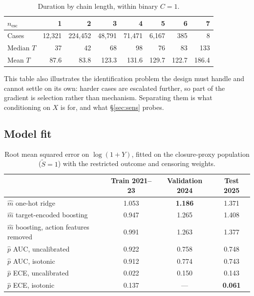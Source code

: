 \documentclass[11pt,a4paper]{article}
\theoremstyle{plain}
\theoremstyle{definition}
\theoremstyle{remark}
\newcommand{\Sproxy}{\widetilde S}
\begin{document}
\begin{table}[h]
\centering
\caption{Duration by chain length, within binary $C=1$.}
\label{tab:nesc-evidence}
\begin{tabular}{lrrrrrrr}
\toprule
$n_{\text{esc}}$ & 1 & 2 & 3 & 4 & 5 & 6 & 7\\
\midrule
Cases & 12,321 & 224,452 & 48,791 & 71,471 & 6,167 & 385 & 8\\
Median $T$ & 37 & 42 & 68 & 98 & 76 & 83 & 133\\
Mean $T$ & 87.6 & 83.8 & 123.3 & 131.6 & 129.7 & 122.7 & 186.4\\
\bottomrule
\end{tabular}
\end{table}

This table also illustrates the identification problem the design must handle and cannot settle
on its own: harder cases are escalated further, so part of the gradient is selection rather than
mechanism. Separating them is what conditioning on $X$ is for, and what \S\ref{sec:sens} probes.

\subsection{Model fit}\label{sec:ev-fit}

\begin{table}[h]
\centering
\caption{Root mean squared error on $\log(1+Y)$, fitted on the closure-proxy population
($\Sproxy=1$) with the restricted outcome and censoring weights.}
\label{tab:fit}
\begin{tabular}{lccc}
\toprule
& Train 2021--23 & Validation 2024 & Test 2025\\
\midrule
$\hat m$ one-hot ridge & 1.053 & \textbf{1.186} & 1.371\\
$\hat m$ target-encoded boosting & 0.947 & 1.265 & 1.408\\
$\hat m$ boosting, action features removed & 0.991 & 1.263 & 1.377\\
\midrule
$\hat p$ AUC, uncalibrated & 0.922 & 0.758 & 0.748\\
$\hat p$ AUC, isotonic & 0.912 & 0.774 & 0.743\\
$\hat p$ ECE, uncalibrated & 0.022 & 0.150 & 0.143\\
$\hat p$ ECE, isotonic & 0.137 & --- & \textbf{0.061}\\
\bottomrule
\end{tabular}
\end{table}
\end{document}
